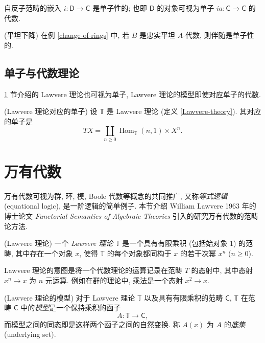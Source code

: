 \begin{example}
	{}
	自反子范畴的嵌入 $i\colon \mathsf D\to\mathsf C$ 是单子性的; 也即 $\mathsf D$ 的对象可视为单子 $ia\colon \mathsf C\to\mathsf C$ 的代数.
\end{example}

\begin{example}
	{(平坦下降)}
	在例 \ref{change-of-rings} 中, 若 $B$ 是忠实平坦 $A$-代数, 则伴随是单子性的.
\end{example}


\subsection{单子与代数理论}

\ref{universal-algebra} 节介绍的 Lawvere 理论也可视为单子, Lawvere 理论的模型即使对应单子的代数.

\begin{definition}
	{(Lawvere 理论对应的单子)}
	设 $\mathbb T$ 是 Lawvere 理论 (定义 \ref{Lawvere-theory}).
	其对应的单子是
	\[
	TX = \coprod_{n\geq 0} \operatorname{Hom}_{\mathbb T}(n,1)\times X^n.
	\]
\end{definition}



\section{万有代数}

\label{universal-algebra}

万有代数可视为群, 环, 模, Boole 代数等概念的共同推广, 又称\emph{等式逻辑} (equational logic), 是一阶逻辑的简单例子. 本节介绍 William Lawvere 1963 年的博士论文 \emph{Functorial Semantics of Algebraic Theories} 引入的研究万有代数的范畴论方法.

\begin{definition}
	[label={Lawvere-theory}]
	{(Lawvere 理论)}
	一个 \emph{Lawvere 理论} $\mathbb T$ 是一个具有有限乘积 (包括始对象 $1$) 的范畴,
	其中存在一个对象 $x$, 使得 $\mathbb T$ 的每个对象都同构于 $x$ 的若干次幂 $x^n$ ($n\geq 0$).
\end{definition}

Lawvere 理论的意图是将一个代数理论的运算记录在范畴 $T$ 的态射中, 其中态射 $x^n \to x$ 为 $n$ 元运算. 例如在群的理论中, 乘法是一个态射 $x^2 \to x$.


\begin{definition}
	{(Lawvere 理论的模型)}
	对于 Lawvere 理论 $\mathbb T$ 以及具有有限乘积的范畴 $\mathsf C$, $\mathbb T$ 在范畴 $\mathsf C$ 中的\emph{模型}是一个保持乘积的函子
	$$
	A \colon \mathbb T \to \mathsf {C},
	$$
	而模型之间的同态即是这样两个函子之间的自然变换.
	称 $A(x)$ 为 $A$ 的\emph{底集} (underlying set).
\end{definition}

